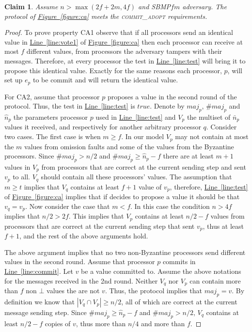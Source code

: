 \documentclass[11pt]{article}
\newtheorem{claim}{Claim}
\newcommand{\namedref}[2]{\hyperref[#2]{#1~\ref*{#2}}}
\newcommand{\figureref}[1]{\namedref{Figure}{#1}}
\newcommand{\lref}[1]{\namedref{Line}{#1}}
\newcommand{\true}{\mathit{true}}
\newcommand{\SBMPfm}{\mbox{SBMP\!$f\!m$}\xspace}
\newcommand{\ca}{{\small\textsc{commit\!\_adopt}}\xspace}
\begin{document}
\begin{claim}\label{claim:CA}
Assume $n>\max(2f+2m,4f)$ and \SBMPfm adversary.  The protocol of \figureref{figure:ca} meets the \ca requirements.
\end{claim}
\begin{proof}
To prove property CA1 observe that if all processors send an identical value in \lref{line:vote1} of \figureref{figure:ca} then each processor can receive at most  $f$ different values, from processors the adversary tampers with their messages. Therefore, at every processor the test in \lref{line:test} will bring it to propose this identical value.  Exactly for the same reasons each processor, $p$, will set up $e_p$ to be {\sc commit} and will return the identical value.

For CA2, assume that  processor $p$ proposes a value in the second round of the protocol. Thus, the test in \lref{line:test} is $\true$.
Denote by  $maj_p$,  $\#maj_p$ and  $\hat n_p$ the parameters processor $p$ used in \lref{line:test} and $V_p$ the multiset of $\bar n_p$ values it received, and 
respectively for another arbitrary processor $q$.  
Consider two cases. The first case is when $m\ge f$. 
In our model $V_p$ may not contain at most the $m$ values from omission faults and some of the values from the Byzantine processors. Since $\#maj_p> n/2 $ and $\#maj_p\ge  \hat n_p-f$ there are at least $m+1$ 
values in $V_p$ from  processors that are correct at the current sending step  and sent $v_p$ to all.  $V_q$ should contain all these processors' values. The assumption that $m\ge t$ implies that $V_q$ contains at least $f+1$ value of $v_p$, therefore, \lref{line:test} of \figureref{figure:ca} implies that if  decides to propose a value it should be that $v_q=v_p$.  Now consider the case that $m<f$.  In this case the condition $n>4f$ implies that $n/2>2f.$ This implies that  $V_p$ contains at least $n/2-f$  values from  processors that are correct at the current sending step that sent $v_p$, thus at least $f+1$, and the rest of the above arguments hold.

The above argument implies that no two non-Byzantine processors send different values in the second round. 
Assume that  processor $p$ commits in \lref{line:commit}.
Let $v$ be a value committed to.  
Assume the above notations for the messages received in the 2nd round.
Neither $V_q$ nor $V_p$ can contain more than $f$ non $\bot$ values the are not $v$.
Thus, the protocol implies that $maj_p=v$.
By definition we know that $|V_q\cap V_p|\ge n/2$, all of which are correct at the current message sending step. 
Since $\#maj_p\ge  \hat n_p-f$ and $\#maj_p> n/2 $,  $V_q$ contains at least $n/2-f$ copies of $v$, thus more than $n/4$ and more than $f$.  
\end{proof}
\end{document}
